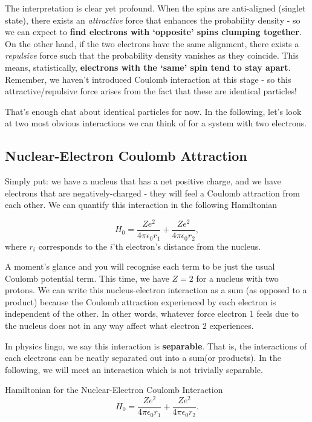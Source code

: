 \documentclass{article}
\numberwithin{equation}{section} %
\begin{document}
The interpretation is clear yet profound. When the spins are anti-aligned (singlet state), there exists an \textit{attractive} force that enhances the probability density - so we can expect to \textbf{find electrons with `opposite' spins clumping together}. On the other hand, if the two electrons have the same alignment, there exists a \textit{repulsive} force such that the probability density vanishes as they coincide. This means, statistically, \textbf{electrons with the `same' spin tend to stay apart}. Remember, we haven't introduced Coulomb interaction at this stage - so this attractive/repulsive force arises from the fact that these are identical particles!

That's enough chat about identical particles for now. In the following, let's look at two most obvious interactions we can think of for a system with two electrons.

\subsection{Nuclear-Electron Coulomb Attraction}\label{coulomb attraction}

Simply put: we have a nucleus that has a net positive charge, and we have electrons that are negatively-charged - they will feel a Coulomb attraction from each other. We can quantify this interaction in the following Hamiltonian

\begin{equation}
H_0=\frac{Ze^2}{4\pi\epsilon_0r_1} + \frac{Ze^2}{4\pi\epsilon_0r_2},
\label{coulomb attraction hamiltonian}
\end{equation}
where $r_i$ corresponds to the $i$'th electron's distance  from the nucleus. 

A moment's glance and you will recognise each term to be just the usual Coulomb potential term. This time, we have $Z=2$ for a nucleus with two protons. We can write this nucleus-electron interaction as a sum (as opposed to a product) because the Coulomb attraction experienced by each electron is independent of the other. In other words, whatever force electron 1 feels due to the nucleus does not in any way affect what electron 2 experiences. 

In physics lingo, we say this interaction is \textbf{separable}. That is, the interactions of each electrons can be neatly separated out into a sum(or products). In the following, we will meet an interaction which is not trivially separable.

\begin{tcolorbox}[colback=pink]
Hamiltonian for the Nuclear-Electron Coulomb Interaction
\begin{equation}
H_0=\frac{Ze^2}{4\pi\epsilon_0r_1} + \frac{Ze^2}{4\pi\epsilon_0r_2}.
\end{equation}
\end{tcolorbox}
\end{document}
